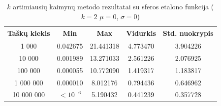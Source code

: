 \begin{table}[H]
    \centering
    \begin{tabular}{|c|c|c|c|c|}
        \hline
        \textbf{Taškų kiekis} & \textbf{Min} & \textbf{Max} & \textbf{Vidurkis} & \textbf{Std. nuokrypis} \\ \hline
        1 000        & 0.042675 & 21.441318 & 4.773470 & 3.904226 \\ \hline
        10 000       & 0.001989 & 13.271033 & 2.561226 & 2.076925 \\ \hline
        100 000      & 0.000055 & 10.772090 & 1.419317 & 1.183817 \\ \hline
        1 000 000    & 0.000010 & 8.012176 & 0.794436 & 0.646962 \\ \hline
        10 000 000   & $<10^{-6}$ & 5.190432 & 0.441239 & 0.357728 \\ \hline
    \end{tabular}
    \caption{$k$ artimiausių kaimynų metodo rezultatai su sferos etalono funkcija ($k = 2$ $\mu = 0$, $\sigma = 0$)}
\end{table}